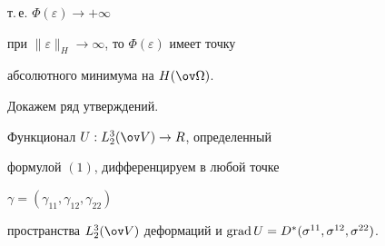 т.\,е. $\Phi(\varepsilon)\to+\infty$ 


при $\|\varepsilon\|_H\to\infty$, то $\Phi(\varepsilon)$ имеет точку 


абсолютного минимума на $H(\ov\Omega)$. 


 


Докажем ряд утверждений. 


 


\begin{thm} 


Функционал $U:L^3_2(\ov V)\to R$, определенный 


формулой $(1)$, дифференцируем в любой точке 


$\gamma=(\gamma_{11},\gamma_{12},\gamma_{22})$ 


пространства $L^3_2(\ov V)$ деформаций и $\grad 


U=D^*(\sigma^{11},\sigma^{12},\sigma^{22})$. 


\end{thm} 


 


